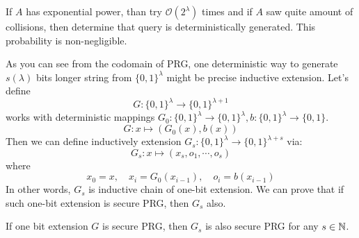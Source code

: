 \documentclass[12pt, a4paper, openany, twoside]{book}
\theoremstyle{definition}
\theoremstyle{remark}
\newcommand{\CO}{{\mathcal {O}}} \newcommand{\CP}{{\mathcal {P}}}
\theoremstyle{plain}
\numberwithin{equation}{section}
\begin{document}
\begin{tcolorbox}[colback=yellow!10!white,colframe=gray!75!black,title=Remark?]

If $A$ has exponential power, than try $\CO(2^\lambda)$ times and if $A$ saw quite amount of collisions, 
then determine that query is deterministically generated. 
This probability is non-negligible. 

\end{tcolorbox}

As you can see from the codomain of PRG, one deterministic way to generate $s(\lambda)$ bits longer 
string from $\{0,1\}^\lambda$ might be precise inductive extension. 
Let's define 
\[G: \{0, 1\}^\lambda \rightarrow \{0,1\}^{\lambda + 1}\]
works with deterministic mappings $G_0: \{0,1\}^{\lambda} \rightarrow \{0,1\}^{\lambda}, b: \{0,1\}^{\lambda} \rightarrow \{0,1\}$.
\[G: x \mapsto (G_0(x), b(x))\]
Then we can define inductively extension $G_s: \{0,1\}^\lambda \rightarrow \{0,1\}^{\lambda + s}$ via: 
\[G_s: x \mapsto (x_s, o_1, \cdots, o_s)\]
where 
\[x_0 = x, \quad x_{i} = G_0(x_{i-1}), \quad o_i = b(x_{i-1})\]
In other words, $G_s$ is inductive chain of one-bit extension. We can prove that if such one-bit extension is 
secure PRG, then $G_s$ also. 

\begin{tcolorbox}[colback=yellow!10!white,colframe=red!75!black,title=PRG Security Theorem]

If one bit extension $G$ is secure PRG, then $G_s$ is also secure PRG for any $s \in {\mathbb {N}}$. 

\end{tcolorbox}
\end{document}

